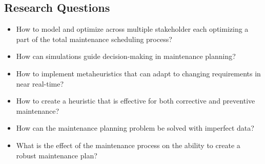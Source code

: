 \documentclass{article}
\begin{document}
\subsection{Research Questions}
\begin{itemize}
    \item How to model and optimize across multiple stakeholder each optimizing a part of the total maintenance scheduling process?
    \item How can simulations guide decision-making in maintenance planning? 
    \item How to implement metaheuristics that can adapt to changing requirements in near real-time? 
    \item How to create a heuristic that is effective for both corrective and preventive maintenance? 
    \item How can the maintenance planning problem be solved with imperfect data? 
    \item What is the effect of the maintenance process on the ability to create a robust maintenance plan? 
\end{itemize}

\nocite{ben-dayaHandbookMaintenanceManagement2009}
\nocite{pinedoSchedulingTheoryAlgorithms2022}



\end{document}
